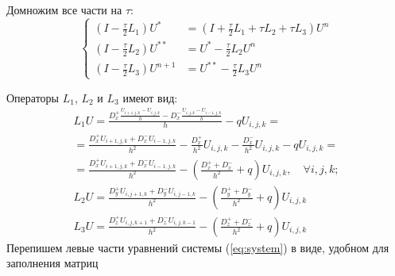 \documentclass[a4paper,12pt]{article}
\begin{document}
Домножим все части на $\tau$:
\begin{equation*}
  \label{eq:system}
  \begin{cases}
      \left( I - \frac{\tau}{2} L_1 \right) U^{*} &=  
          \left( I + \frac{\tau}{2} L_1 +  \tau L_2 + \tau L_3 \right) U^n \\
      \left( I - \frac{\tau}{2} L_2 \right) U^{**} & = U^{*} - \frac{\tau}{2} L_2 U^n \\
      \left( I - \frac{\tau}{2} L_3 \right) U^{n+1} & =  U^{**} - \frac{\tau}{2} L_3 U^n
  \end{cases}
\end{equation*}

Операторы $L_1$, $L_2$ и $L_3$ имеют вид:
\begin{equation}
  \begin{aligned}
    L_1 U = \frac{D^+_x \frac{U_{i+1,j,k} - U_{i,j,k}}{h} - D^-_x\frac{U_{i,j,k} - U_{i-1,j,k}}{h}}{h}  - qU_{i,j,k} = \\
    = \frac{D^+_x U_{i+1,j,k} + D^-_x U_{i-1,j,k}}{h^2} - \frac{D^+_x}{h^2}U_{i,j,k} - \frac{D^-_x}{h^2} U_{i,j,k} - q U_{i,j,k} = \\
    = \frac{D^+_x U_{i+1,j,k} + D^-_x U_{i-1,j,k}}{h^2} - \left(\frac{D^+_x + D^-_x}{h^2} + q \right) U_{i,j,k}, \quad \forall i,j,k; \\
    L_2 U = \frac{D^+_y U_{i,j+1,k} + D^-_y U_{i,j-1,k}}{h^2} - \left(\frac{D^+_y + D^-_y}{h^2} + q \right) U_{i,j,k} \\
    L_3 U = \frac{D^+_z U_{i,j,k+1} + D^-_z U_{i,j,k-1}}{h^2} - \left(\frac{D^+_z + D^-_z}{h^2} + q \right) U_{i,j,k}
  \end{aligned}
\end{equation}
Перепишем левые части уравнений системы (\ref{eq:system}) в виде, удобном для заполнения матриц
\end{document}
